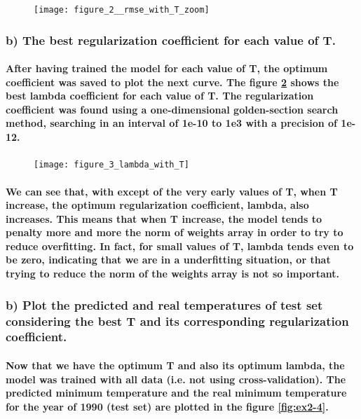 \documentclass[a4paper]{article}
\begin{document}
\begin{figure}[H]
    \centering
    \texttt{[image: figure\_2\_\_rmse\_with\_T\_zoom]}
    \caption{}
    \label{fig:ex2-2}
\end{figure}

\subsubsection{b) The best regularization coefficient for each value of T.}

\paragraph{After having trained the model for each value of T, the optimum coefficient was saved to plot the next curve. The figure \ref{fig:ex2-3} shows the best lambda coefficient for each value of T. The regularization coefficient was found using a one-dimensional golden-section search method, searching in an interval of 1e-10 to 1e3 with a precision of 1e-12.}

\begin{figure}[H]
    \centering
    \texttt{[image: figure\_3\_lambda\_with\_T]}
    \caption{}
    \label{fig:ex2-3}
\end{figure}

\paragraph{We can see that, with except of the very early values of T, when T increase, the optimum regularization coefficient, lambda, also increases. This means that when T increase, the model tends to penalty more and more the norm of weights array in order to try to reduce overfitting. In fact, for small values of T, lambda tends even to be zero, indicating that we are in a underfitting situation, or that trying to reduce the norm of the weights array is not so important.}

\subsubsection{b) Plot the predicted and real temperatures of test set considering the best T and its corresponding regularization coefficient.}

\paragraph{Now that we have the optimum T and also its optimum lambda, the model was trained with all data (i.e. not using cross-validation). The predicted minimum temperature and the real minimum temperature for the year of 1990 (test set) are plotted in the figure \ref{fig:ex2-4}.}
\end{document}
